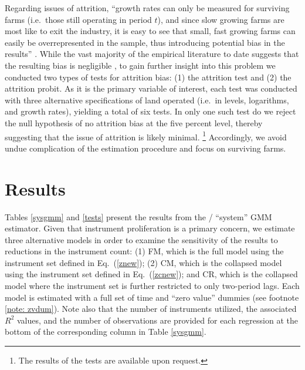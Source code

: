 \documentclass[english]{article}
\begin{document}
Regarding issues of attrition, ``growth rates can only be measured for 
surviving farms (i.e.\ those still operating in period $t$), and since slow 
growing farms are most like to exit the industry, it is easy to see that small, 
fast growing farms can easily be overrepresented in the sample, thus 
introducing potential bias in the results'' \citep[pg.\ 790]{bakucs2009}. 
While the vast majority of the empirical literature to date suggests that the 
resulting bias is negligible \citep{evans1987, hall1987, weiss1999, dries2004},
to gain further insight into this problem we conducted two types of tests for
attrition bias: (1) the \citet{becketti1988} attrition test and (2) the 
\citet{fitzgerald1998} attrition probit.
As it is the primary variable of interest, each test was conducted with three 
alternative specifications of land operated (i.e.\ in levels, logarithms, and 
growth rates), yielding a total of six tests.
In only one such test do we reject the null hypothesis of no attrition bias at 
the five percent level, thereby suggesting that the issue of attrition is likely 
minimal.%
\footnote{The results of the tests are available upon request.}
Accordingly, we avoid undue complication of the estimation procedure 
and focus on surviving farms.


\section{Results}
\label{sec: results}

Tables \ref{sysgmm} and \ref{tests} present the results from the 
\citet{arellano1995}/\citet{blundell1998} ``system'' GMM estimator. 
Given that instrument proliferation is a primary concern, we estimate 
three alternative models in order to examine the sensitivity of the results 
to reductions in the instrument count: (1) FM, which is the full model using 
the instrument set defined in Eq.\ (\ref{znew}); (2) CM, which is the 
collapsed model using the instrument set defined in Eq.\ (\ref{zcnew}); 
and CR, which is the collapsed model where the instrument set is further 
restricted to only two-period lags.
Each model is estimated with a full set of time and ``zero value'' dummies 
(see footnote \ref{note: zvdum}).
Note also that the number of instruments utilized, the associated $R^2$ values, 
and the number of observations are provided for each regression at the 
bottom of the corresponding column in Table \ref{sysgmm}. 
\end{document}
